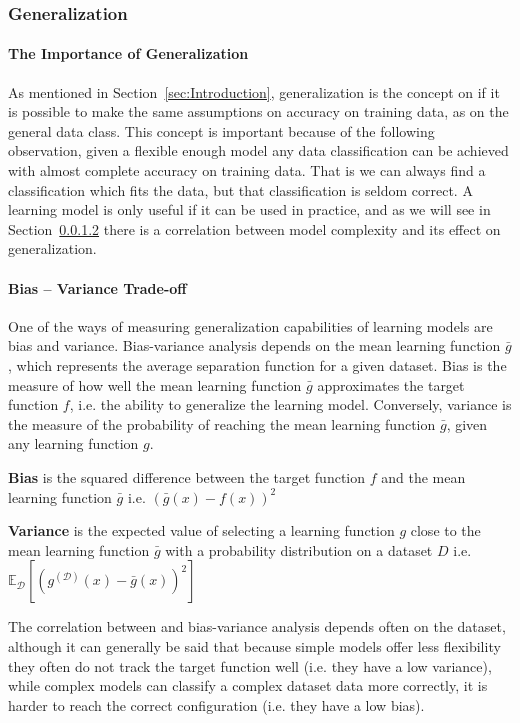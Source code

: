 \subsubsection{Generalization}
\label{ssub:Generalization}
\paragraph{The Importance of Generalization}
\label{par:TheImportanceofGeneralization}
As mentioned in Section~\ref{sec:Introduction}, generalization is the concept on if it is possible to make the same assumptions on accuracy on training data,
as on the general data class. This concept is important because of the following observation, given a flexible enough model any data classification can be achieved
with almost complete accuracy on training data. That is we can always find a classification which fits the data, but that classification is seldom correct.
A learning model is only useful if it can be used in practice, and as we will see in Section~\ref{par:Bias-VarianceTrade-off} there is a correlation between model complexity
and its effect on generalization.
\paragraph{Bias -- Variance Trade-off}
\label{par:Bias-VarianceTrade-off}
One of the ways of measuring generalization capabilities of learning models are bias and variance. Bias-variance analysis depends on the mean learning function $\bar{g}$,
which represents the average separation function for a given dataset.
Bias is the measure of how well the mean learning function $\bar{g}$ approximates the target function $f$, i.e. the ability to generalize the learning model. Conversely,
variance is the measure of the probability of reaching the mean learning function $\bar{g}$, given any learning function $g$.
\begin{dfnt}
  \textbf{Bias} is the squared difference between the target function $f$ and the mean learning function $\bar{g}$ i.e. $\left(\bar{g}(x)-f(x)\right)^2$
\end{dfnt}
\begin{dfnt}
  \textbf{Variance} is the expected value of selecting a learning function $g$ close to the mean learning function $\bar{g}$ with a probability distribution on
  a dataset $D$ i.e. $\mathbb{E}_\mathcal{D}\left[(g^{(\mathcal{D})}(x)-\bar{g}(x))^2\right]$
\end{dfnt}

The correlation between and bias-variance analysis depends often on the dataset,
although it can generally be said that because simple models offer less flexibility they often do not track the target function well (i.e. they have a low variance),
while complex models can classify a complex dataset data more correctly, it is harder to reach the correct configuration (i.e. they have a low bias).


